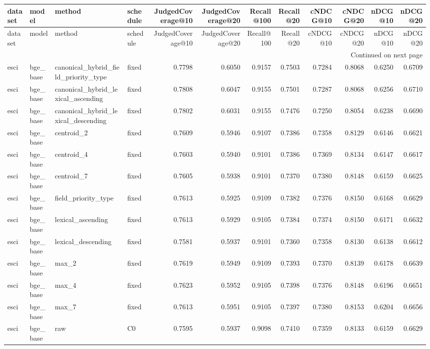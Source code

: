 \begin{longtable}{llllrrrrrrrr}
\toprule
dataset & model & method & schedule & JudgedCoverage@10 & JudgedCoverage@20 & Recall@100 & Recall@20 & cNDCG@10 & cNDCG@20 & nDCG@10 & nDCG@20 \\
\midrule
\endfirsthead
\toprule
dataset & model & method & schedule & JudgedCoverage@10 & JudgedCoverage@20 & Recall@100 & Recall@20 & cNDCG@10 & cNDCG@20 & nDCG@10 & nDCG@20 \\
\midrule
\endhead
\midrule
\multicolumn{12}{r}{Continued on next page} \\
\midrule
\endfoot
\bottomrule
\endlastfoot
esci & bge\_base & canonical\_hybrid\_field\_priority\_type & fixed & 0.7798 & 0.6050 & 0.9157 & 0.7503 & 0.7284 & 0.8068 & 0.6250 & 0.6709 \\
esci & bge\_base & canonical\_hybrid\_lexical\_ascending & fixed & 0.7808 & 0.6047 & 0.9155 & 0.7501 & 0.7287 & 0.8068 & 0.6256 & 0.6710 \\
esci & bge\_base & canonical\_hybrid\_lexical\_descending & fixed & 0.7802 & 0.6031 & 0.9155 & 0.7476 & 0.7250 & 0.8054 & 0.6238 & 0.6690 \\
esci & bge\_base & centroid\_2 & fixed & 0.7609 & 0.5946 & 0.9107 & 0.7386 & 0.7358 & 0.8129 & 0.6146 & 0.6621 \\
esci & bge\_base & centroid\_4 & fixed & 0.7603 & 0.5940 & 0.9101 & 0.7386 & 0.7369 & 0.8134 & 0.6147 & 0.6617 \\
esci & bge\_base & centroid\_7 & fixed & 0.7605 & 0.5938 & 0.9101 & 0.7370 & 0.7380 & 0.8148 & 0.6159 & 0.6625 \\
esci & bge\_base & field\_priority\_type & fixed & 0.7613 & 0.5925 & 0.9109 & 0.7382 & 0.7376 & 0.8150 & 0.6168 & 0.6629 \\
esci & bge\_base & lexical\_ascending & fixed & 0.7613 & 0.5929 & 0.9105 & 0.7384 & 0.7374 & 0.8150 & 0.6171 & 0.6632 \\
esci & bge\_base & lexical\_descending & fixed & 0.7581 & 0.5937 & 0.9101 & 0.7360 & 0.7358 & 0.8130 & 0.6138 & 0.6612 \\
esci & bge\_base & max\_2 & fixed & 0.7619 & 0.5949 & 0.9109 & 0.7393 & 0.7370 & 0.8139 & 0.6178 & 0.6639 \\
esci & bge\_base & max\_4 & fixed & 0.7623 & 0.5952 & 0.9105 & 0.7398 & 0.7376 & 0.8148 & 0.6196 & 0.6651 \\
esci & bge\_base & max\_7 & fixed & 0.7613 & 0.5951 & 0.9105 & 0.7397 & 0.7380 & 0.8153 & 0.6204 & 0.6656 \\
esci & bge\_base & raw & C0 & 0.7595 & 0.5937 & 0.9098 & 0.7410 & 0.7359 & 0.8133 & 0.6159 & 0.6629 \\

\end{longtable}
